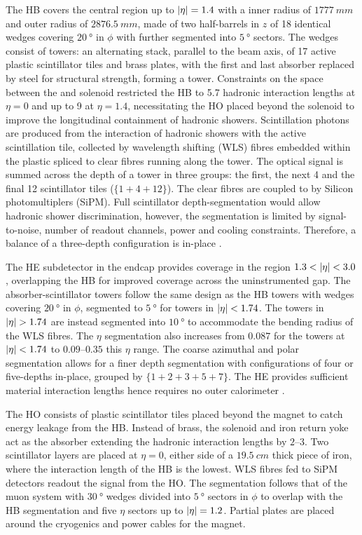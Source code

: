 The HB covers the central region up to $|\eta|=1.4$ with a inner radius of ${\SI{1777}{mm}}$ and outer radius of ${\SI{2876.5}{mm}}$, made of two half-barrels in $z$ of 18 identical wedges covering ${\SI{20}{\degree}}$ in $\phi$ with further segmented into  ${\SI{5}{\degree}}$ sectors. The wedges consist of towers: an alternating stack, parallel to the beam axis, of 17 active plastic scintillator tiles and brass plates, with the first and last absorber replaced by steel for structural strength, forming a tower.  Constraints on the space  between the \ECAL and solenoid restricted the HB to 5.7 hadronic interaction lengths at ${\eta=0}$ and up to 9 at ${\eta=1.4}$, necessitating the HO placed beyond the solenoid to improve the longitudinal containment of hadronic showers. Scintillation photons are produced from the interaction of hadronic showers with the active scintillation tile, collected by wavelength shifting (WLS) fibres embedded within the plastic spliced to clear fibres running along the tower. The optical signal is summed across the depth of a tower in three groups: the first, the next 4 and the final 12 scintillator tiles (${\{1+4+12\}}$). The clear fibres are coupled to by Silicon photomultiplers (SiPM). Full scintillator depth-segmentation would allow hadronic shower discrimination, however, the segmentation is limited by signal-to-noise, number of readout channels, power and cooling constraints.  Therefore, a balance of a three-depth configuration is in-place \cite{Mans:1481837}.

The HE subdetector in the endcap provides coverage in the region ${1.3<\aeta<3.0}$, overlapping the HB for improved coverage across the uninstrumented gap. The absorber-scintillator towers follow the same design as the HB towers with wedges covering ${\SI{20}{\degree}}$ in $\phi$, segmented to ${\SI{5}{\degree}}$ for towers in ${|\eta|<1.74}$. The towers in ${\aeta>1.74}$ are instead segmented into ${\SI{10}{\degree}}$ to accommodate the bending radius of the WLS fibres. The $\eta$ segmentation also increases from ${0.087}$ for the towers at ${|\eta|<1.74}$ to $0.09$--$0.35$ this $\eta$ range. The coarse azimuthal and polar segmentation allows for a finer depth segmentation with configurations of four or five-depths in-place, grouped by ${\{1+2+3+5+7\}}$. The HE provides sufficient material interaction lengths hence requires no outer calorimeter \cite{Mans:1481837}.

The HO consists of plastic scintillator tiles placed beyond the magnet to catch energy leakage from the HB. Instead of brass, the solenoid and iron return yoke act as the absorber extending the hadronic interaction lengths by $2$--$3$. Two scintillator layers are placed at ${\eta=0}$, either side of a ${\SI{19.5}{cm}}$ thick piece of iron, where the interaction length of the HB is the lowest. WLS fibres fed to SiPM detectors readout the signal from the HO. The segmentation follows that of the muon system with ${\SI{30}{\degree}}$ wedges divided into ${\SI{5}{\degree}}$ sectors in $\phi$ to overlap with the HB segmentation and five $\eta$ sectors up to ${|\eta|=1.2}$. Partial plates are placed around the cryogenics and power cables for the magnet.

